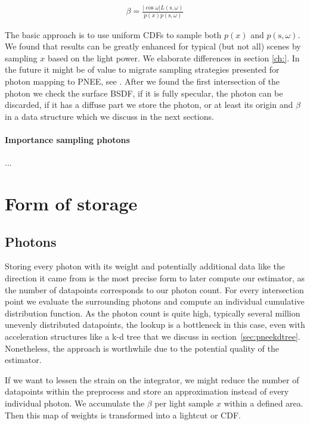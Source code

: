 \begin{align}\label{eq:beta}
\beta = \frac{|\cos{\omega}|L(\text{s}, \omega)}{p(x)p(\text{s}, \omega)}
\end{align}

The basic approach is to use uniform CDFs to sample both $p(x)$ and $p(\text{s}, \omega)$. We found that results can be greatly enhanced for typical (but not all) scenes by sampling $x$ based on the light power. We elaborate differences in section \ref{ch:}. In the future it might be of value to migrate sampling strategies presented for photon mapping to PNEE, see \cite{DBLP:conf/rt/SuykensW00}. After we found the first intersection of the photon we check the surface BSDF, if it is fully specular, the photon can be discarded, if it has a diffuse part we store the photon, or at least its origin and $\beta$ in a data structure which we discuss in the next sections.

\paragraph*{Importance sampling photons}
\label{ch:photonimportancesample}
...

\section{Form of storage}
\label{ch:formofstorage}

\subsection{Photons}

Storing every photon with its weight and potentially additional data like the direction it came from is the most precise form to later compute our estimator, as the number of datapoints corresponds to our photon count. For every intersection point we evaluate the surrounding photons and compute an individual cumulative distribution function. As the photon count is quite high, typically several million unevenly distributed datapoints, the lookup is a bottleneck in this case, even with acceleration structures like a k-d tree that we discuss in section~\ref{sec:pneekdtree}. Nonetheless, the approach is worthwhile due to the potential quality of the estimator.

If we want to lessen the strain on the integrator, we might reduce the number of datapoints within the preprocess and store an approximation instead of every individual photon. We accumulate the $\beta$ per light sample $x$ within a defined area. Then this map of weights is transformed into a lightcut or CDF.

